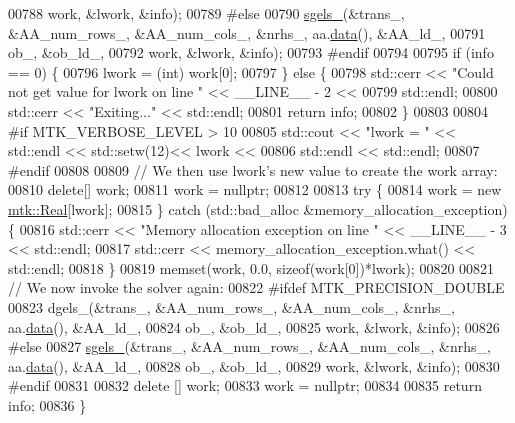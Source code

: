 \begin{DoxyCode}
00788          work, &lwork, &info);
00789 \textcolor{preprocessor}{  #else}
00790   \hyperlink{namespacemtk_ada6df1b733204aa7ff0b1ec7556288f9}{sgels\_}(&trans\_, &AA\_num\_rows\_, &AA\_num\_cols\_, &nrhs\_, aa.\hyperlink{classmtk_1_1DenseMatrix_a0c33b8a9e01d157c61ddbdf807c25d84}{data}(), &AA\_ld\_,
00791          ob\_, &ob\_ld\_,
00792          work, &lwork, &info);
00793 \textcolor{preprocessor}{  #endif}
00794 
00795   \textcolor{keywordflow}{if} (info == 0) \{
00796     lwork = (int) work[0];
00797   \} \textcolor{keywordflow}{else} \{
00798     std::cerr << \textcolor{stringliteral}{"Could not get value for lwork on line "} << \_\_LINE\_\_ - 2 <<
00799       std::endl;
00800     std::cerr << \textcolor{stringliteral}{"Exiting..."} << std::endl;
00801     \textcolor{keywordflow}{return} info;
00802   \}
00803 
00804 \textcolor{preprocessor}{  #if MTK\_VERBOSE\_LEVEL > 10}
00805   std::cout << \textcolor{stringliteral}{"lwork = "} << std::endl << std::setw(12)<< lwork <<
00806     std::endl << std::endl;
00807 \textcolor{preprocessor}{  #endif}
00808 
00809   \textcolor{comment}{// We then use lwork's new value to create the work array:}
00810   \textcolor{keyword}{delete}[] work;
00811   work = \textcolor{keyword}{nullptr};
00812 
00813   \textcolor{keywordflow}{try} \{
00814     work = \textcolor{keyword}{new} \hyperlink{group__c01-roots_gac080bbbf5cbb5502c9f00405f894857d}{mtk::Real}[lwork];
00815   \} \textcolor{keywordflow}{catch} (std::bad\_alloc &memory\_allocation\_exception) \{
00816     std::cerr << \textcolor{stringliteral}{"Memory allocation exception on line "} << \_\_LINE\_\_ - 3 << std::endl;
00817     std::cerr << memory\_allocation\_exception.what() << std::endl;
00818   \}
00819   memset(work, 0.0, \textcolor{keyword}{sizeof}(work[0])*lwork);
00820 
00821   \textcolor{comment}{// We now invoke the solver again:}
00822 \textcolor{preprocessor}{  #ifdef MTK\_PRECISION\_DOUBLE}
00823   dgels\_(&trans\_, &AA\_num\_rows\_, &AA\_num\_cols\_, &nrhs\_, aa.\hyperlink{classmtk_1_1DenseMatrix_a0c33b8a9e01d157c61ddbdf807c25d84}{data}(), &AA\_ld\_,
00824          ob\_, &ob\_ld\_,
00825          work, &lwork, &info);
00826 \textcolor{preprocessor}{  #else}
00827   \hyperlink{namespacemtk_ada6df1b733204aa7ff0b1ec7556288f9}{sgels\_}(&trans\_, &AA\_num\_rows\_, &AA\_num\_cols\_, &nrhs\_, aa.\hyperlink{classmtk_1_1DenseMatrix_a0c33b8a9e01d157c61ddbdf807c25d84}{data}(), &AA\_ld\_,
00828          ob\_, &ob\_ld\_,
00829          work, &lwork, &info);
00830 \textcolor{preprocessor}{  #endif}
00831 
00832   \textcolor{keyword}{delete} [] work;
00833   work = \textcolor{keyword}{nullptr};
00834 
00835   \textcolor{keywordflow}{return} info;
00836 \}
\end{DoxyCode}
